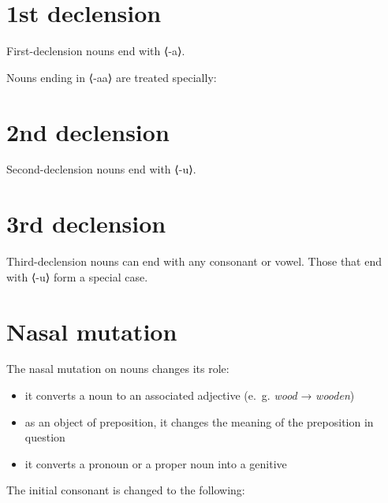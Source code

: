 \documentclass{book}
\newcommand{\ortho}[1]{⟨#1⟩}
\begin{document}
\section{1st declension}

First-declension nouns end with \ortho{-a}.


Nouns ending in \ortho{-aa} are treated specially:


\section{2nd declension}

Second-declension nouns end with \ortho{-u}.


\section{3rd declension}

Third-declension nouns can end with any consonant or vowel. Those that end with \ortho{-u} form a special case.







\section{Nasal mutation}

The nasal mutation on nouns changes its role:

\begin{itemize}
    \item it converts a noun to an associated adjective (e.~g. \emph{wood} → \emph{wooden})
    \item as an object of preposition, it changes the meaning of the preposition in question
    \item it converts a pronoun or a proper noun into a genitive
\end{itemize}

The initial consonant is changed to the following:
\end{document}
